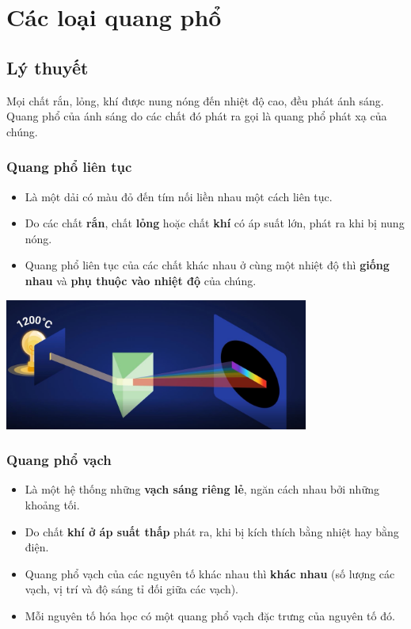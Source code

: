 
\chapter[Các loại quang phổ]{Các loại quang phổ}
\section{Lý thuyết}
Mọi chất rắn, lỏng, khí được nung nóng đến nhiệt độ cao, đều phát ánh sáng. Quang phổ của ánh sáng do các chất đó phát ra gọi là quang phổ phát xạ của chúng.

\subsection{Quang phổ liên tục}

\begin{itemize}
	
	\item Là một dải có màu đỏ đến tím nối liền nhau một cách liên tục.
	
	\item Do các chất \textbf{rắn}, chất \textbf{lỏng} hoặc chất \textbf{khí} có áp suất lớn, phát ra khi bị nung nóng.
	
	\item Quang phổ liên tục của các chất khác nhau ở cùng một nhiệt độ thì \textbf{giống nhau} và \textbf{phụ thuộc vào nhiệt độ} của chúng.
	
\end{itemize}
\begin{center}
	\includegraphics[width=10cm]{../figs/VN12-PH-36-L-021-2-1.JPG}
\end{center}

\subsection{Quang phổ vạch}

\begin{itemize}
	
	\item Là một hệ thống những \textbf{vạch sáng riêng lẻ}, ngăn cách nhau bởi những khoảng tối.
	
	\item Do chất \textbf{khí ở áp suất thấp} phát ra, khi bị kích thích bằng nhiệt hay bằng điện.
	
	\item Quang phổ vạch của các nguyên tố khác nhau thì \textbf{khác nhau} (số lượng các vạch, vị trí và độ sáng tỉ đối giữa các vạch).
	
	\item Mỗi nguyên tố hóa học có một quang phổ vạch đặc trưng của nguyên tố đó.
	
\end{itemize}

